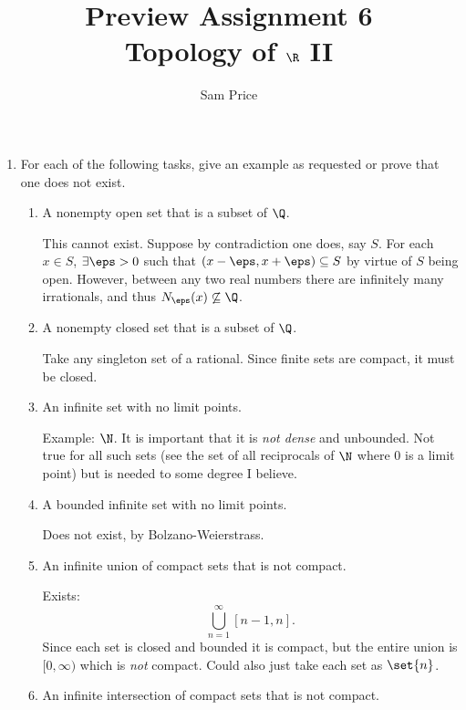 \documentclass{article}
\author{Sam Price}
\date{}
\title{Preview Assignment 6\\\Large{Topology of $\R$ II}}
\begin{document}
\maketitle

\begin{enumerate}

  \item For each of the following tasks, give an example as requested or prove that one does not exist.

        \begin{enumerate}

          \item A nonempty open set that is a subset of $\Q$.

                This cannot exist. Suppose by contradiction one does, say $S$. For each $x \in S$, $\exists \eps > 0$
                such that $(x - \eps, x + \eps) \subseteq S$ by virtue of $S$ being open. However, between any two real numbers there
                are infinitely many irrationals, and thus $N_{\eps}(x) \not\subseteq \Q$.

          \item A nonempty closed set that is a subset of $\Q$.

                Take any singleton set of a rational. Since finite sets are compact, it must be closed.

          \item An infinite set with no limit points.

                Example: $\N$. It is important that it is \emph{not dense} and unbounded.
                Not true for all such sets (see the set of all reciprocals of $\N$ where 0 is a limit point)
                but is needed to some degree I believe.

          \item A bounded infinite set with no limit points.

                Does not exist, by Bolzano-Weierstrass.

          \item An infinite union of compact sets that is not compact.

                Exists:
                \[ \bigcup_{n = 1}^{\infty}[n - 1, n]. \]
                Since each set is closed and bounded it is compact, but the entire union is $\lbrack 0, \infty \rparen$
                which is \emph{not} compact. Could also just take each set as $\set{n}$.

          \item An infinite intersection of compact sets that is not compact.


\end{enumerate}
\end{enumerate}
\end{document}
